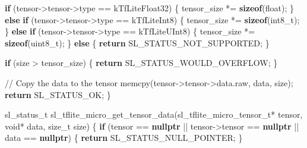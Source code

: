 \documentclass[
  9pt,
  letterpaper,
  abstract,
  titlepage]{scrbook}
\newenvironment{Shaded}{\begin{snugshade}}{\end{snugshade}}
\newcommand{\CommentTok}[1]{\textcolor[rgb]{0.37,0.37,0.37}{#1}}
\newcommand{\ControlFlowTok}[1]{\textcolor[rgb]{0.00,0.23,0.31}{\textbf{#1}}}
\newcommand{\DataTypeTok}[1]{\textcolor[rgb]{0.68,0.00,0.00}{#1}}
\newcommand{\KeywordTok}[1]{\textcolor[rgb]{0.00,0.23,0.31}{\textbf{#1}}}
\newcommand{\NormalTok}[1]{\textcolor[rgb]{0.00,0.23,0.31}{#1}}
\newcommand{\OperatorTok}[1]{\textcolor[rgb]{0.37,0.37,0.37}{#1}}
\begin{document}
\begin{Shaded}
\begin{Highlighting}[]
  \ControlFlowTok{if} \OperatorTok{(}\NormalTok{tensor}\OperatorTok{{-}\textgreater{}}\NormalTok{tensor}\OperatorTok{{-}\textgreater{}}\NormalTok{type }\OperatorTok{==}\NormalTok{ kTfLiteFloat32}\OperatorTok{)} \OperatorTok{\{}
\NormalTok{    tensor\_size }\OperatorTok{*=} \KeywordTok{sizeof}\OperatorTok{(}\DataTypeTok{float}\OperatorTok{);}
  \OperatorTok{\}} \ControlFlowTok{else} \ControlFlowTok{if} \OperatorTok{(}\NormalTok{tensor}\OperatorTok{{-}\textgreater{}}\NormalTok{tensor}\OperatorTok{{-}\textgreater{}}\NormalTok{type }\OperatorTok{==}\NormalTok{ kTfLiteInt8}\OperatorTok{)} \OperatorTok{\{}
\NormalTok{    tensor\_size }\OperatorTok{*=} \KeywordTok{sizeof}\OperatorTok{(}\DataTypeTok{int8\_t}\OperatorTok{);}
  \OperatorTok{\}} \ControlFlowTok{else} \ControlFlowTok{if} \OperatorTok{(}\NormalTok{tensor}\OperatorTok{{-}\textgreater{}}\NormalTok{tensor}\OperatorTok{{-}\textgreater{}}\NormalTok{type }\OperatorTok{==}\NormalTok{ kTfLiteUInt8}\OperatorTok{)} \OperatorTok{\{}
\NormalTok{    tensor\_size }\OperatorTok{*=} \KeywordTok{sizeof}\OperatorTok{(}\DataTypeTok{uint8\_t}\OperatorTok{);}
  \OperatorTok{\}} \ControlFlowTok{else} \OperatorTok{\{}
    \ControlFlowTok{return}\NormalTok{ SL\_STATUS\_NOT\_SUPPORTED}\OperatorTok{;}
  \OperatorTok{\}}
  
  \ControlFlowTok{if} \OperatorTok{(}\NormalTok{size }\OperatorTok{\textgreater{}}\NormalTok{ tensor\_size}\OperatorTok{)} \OperatorTok{\{}
    \ControlFlowTok{return}\NormalTok{ SL\_STATUS\_WOULD\_OVERFLOW}\OperatorTok{;}
  \OperatorTok{\}}
  
  \CommentTok{// Copy the data to the tensor}
\NormalTok{  memcpy}\OperatorTok{(}\NormalTok{tensor}\OperatorTok{{-}\textgreater{}}\NormalTok{tensor}\OperatorTok{{-}\textgreater{}}\NormalTok{data}\OperatorTok{.}\NormalTok{raw}\OperatorTok{,}\NormalTok{ data}\OperatorTok{,}\NormalTok{ size}\OperatorTok{);}
  \ControlFlowTok{return}\NormalTok{ SL\_STATUS\_OK}\OperatorTok{;}
\OperatorTok{\}}

\NormalTok{sl\_status\_t sl\_tflite\_micro\_get\_tensor\_data}\OperatorTok{(}\NormalTok{sl\_tflite\_micro\_tensor\_t}\OperatorTok{*}\NormalTok{ tensor}\OperatorTok{,} 
                                            \DataTypeTok{void}\OperatorTok{*}\NormalTok{ data}\OperatorTok{,} 
                                            \DataTypeTok{size\_t}\NormalTok{ size}\OperatorTok{)}
\OperatorTok{\{}
  \ControlFlowTok{if} \OperatorTok{(}\NormalTok{tensor }\OperatorTok{==} \KeywordTok{nullptr} \OperatorTok{||}\NormalTok{ tensor}\OperatorTok{{-}\textgreater{}}\NormalTok{tensor }\OperatorTok{==} \KeywordTok{nullptr} \OperatorTok{||}\NormalTok{ data }\OperatorTok{==} \KeywordTok{nullptr}\OperatorTok{)} \OperatorTok{\{}
    \ControlFlowTok{return}\NormalTok{ SL\_STATUS\_NULL\_POINTER}\OperatorTok{;}
  \OperatorTok{\}}
  

\end{Highlighting}
\end{Shaded}
\end{document}
